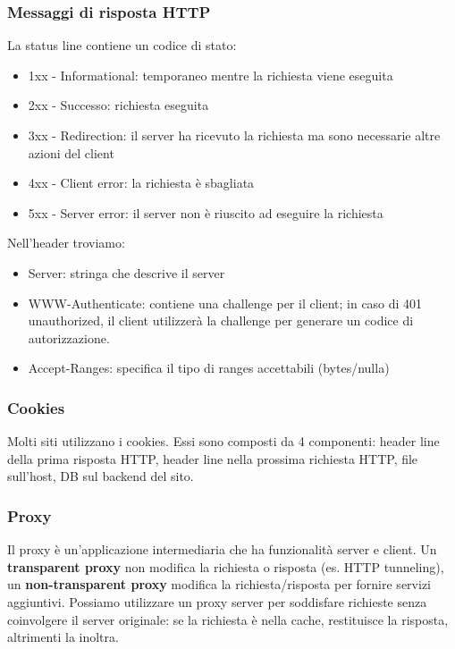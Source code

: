\documentclass[11pt]{article}
\begin{document}
\subsubsection{Messaggi di risposta HTTP}
La status line contiene un codice di stato:
\begin{itemize}
    \item 1xx - Informational: temporaneo mentre la richiesta viene eseguita
    \item 2xx - Successo: richiesta eseguita 
    \item 3xx - Redirection: il server ha ricevuto la richiesta ma sono necessarie altre azioni del client 
    \item 4xx - Client error: la richiesta è sbagliata
    \item 5xx - Server error: il server non è riuscito ad eseguire la richiesta 
\end{itemize}
Nell'header troviamo:
\begin{itemize}
    \item Server: stringa che descrive il server 
    \item WWW-Authenticate: contiene una challenge per il client; in caso di 401 unauthorized, il client utilizzerà la challenge per generare un codice di autorizzazione.
    \item Accept-Ranges: specifica il tipo di ranges accettabili (bytes/nulla)
\end{itemize}
\subsubsection{Cookies}
Molti siti utilizzano i cookies. Essi sono composti da 4 componenti: header line della prima risposta HTTP, header line nella prossima richiesta HTTP, file sull'host, DB sul backend del sito. 
\subsubsection{Proxy}
Il proxy è un'applicazione intermediaria che ha funzionalità server e client. Un \textbf{transparent proxy} non modifica la richiesta o risposta (es. HTTP tunneling), un \textbf{non-transparent proxy} modifica la richiesta/risposta per fornire servizi aggiuntivi.
Possiamo utilizzare un proxy server per soddisfare richieste senza coinvolgere il server originale: se la richiesta è nella cache, restituisce la risposta, altrimenti la inoltra. 
\end{document}
